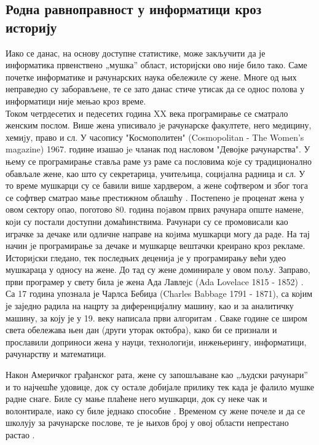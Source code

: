 \documentclass[a4paper]{article}
\begin{document}
\subsection{Родна равноправност у информатици кроз историју}

Иако се данас, на основу доступне статистике, може закључити да је информатика првенствено „мушка”
област, историјски ово није било тако. Саме почетке информатике и рачунарских наука обележиле су 
жене. Многе од њих неправедно су заборављене, те се зато данас стиче утисак да се однос
полова у информатици није мењао кроз време. \\

Током четрдесетих и педесетих година XX века програмирање се сматрало женским послом. Више жена 
уписивало jе рачунарске факултете, него медицину, хемиjу, право и сл. У часопису "Космополитен" 
(Cosmopolitan - The Women's magazine) 1967. године изашао je чланак под насловом "Девојке 
рачунарства". У њему се програмирање ставља раме уз раме са пословима коjе су традиционално 
обављале жене, као што су секретарица, учитељица, социjална радница и сл.
У то време мушкарци су се бавили више хардвером, а жене софтвером и због тога се софтвер сматрао 
мање престижном облашћу \cite{women_softver}. Постепено jе проценат жена у овом сектору опао, 
поготово 80. година поjавом првих рачунара опште намене, коjи су постали доступни домаћинствима. 
Рачунари су се промовисали као играчке за дечаке или одличне направе на коjима мушкарци могу да 
раде. На тај начин jе програмирање за дечаке и мушкарце вештачки креирано кроз рекламе.\\

Историjски гледано, тек последњих децениjа jе у програмирању већи удео мушкараца у односу на жене.
До тад су жене доминирале у овом пољу. Заправо, први програмер у свету била jе жена Ада Лавлеjс 
(Ada Lovelace 1815 - 1852) \cite{ada_l}. Са 17 година упознала је Чарлса Бебиџа 
(Charles Babbage 1791 - 1871), са којим је заједно радила на нацрту за диференцијалну машину, као 
и за аналитичку машину, за коју је у 19. веку написала први алгоритам \cite{ada_l_prog}. Сваке 
године се широм света обележава њен дан (други уторак октобра), како би се признали и прославили 
доприноси жена у науци, технологиjи, инжењерингу, информатици, рачунарству и математици. 

Након Америчког грађанског рата, жене су запошљаване као „људски рачунари” и то најчешће удовице,
док су остале добијале прилику тек када је фалило мушке радне снаге. Биле су мање плаћене него 
мушкарци, док су неке чак и волонтирале, иако су биле једнако способне \cite{women_lover_price}. 
Временом су жене почеле и да се школују за рачунарске послове, те је њихов број у овој области 
непрестано растао \cite{women_education_it}.\\
\end{document}
